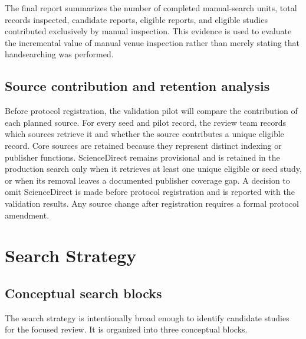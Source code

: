The final report summarizes the number of completed manual-search units, total records inspected,
candidate reports, eligible reports, and eligible studies contributed exclusively by manual
inspection. This evidence is used to evaluate the incremental value of manual venue inspection
rather than merely stating that handsearching was performed.


\subsection{Source contribution and retention analysis}

Before protocol registration, the validation pilot will compare the contribution of each planned source. For every seed and pilot record, the review team records which sources retrieve it and whether the source contributes a unique eligible record. Core sources are retained because they represent distinct indexing or publisher functions. ScienceDirect remains provisional and is retained in the production search only when it retrieves at least one unique eligible or seed study, or when its removal leaves a documented publisher coverage gap. A decision to omit ScienceDirect is made before protocol registration and is reported with the validation results. Any source change after registration requires a formal protocol amendment.

\section{Search Strategy}
\label{sec:protocol_search}

\subsection{Conceptual search blocks}

The search strategy is intentionally broad enough to identify candidate studies for the focused review. It is organized into three conceptual blocks.

